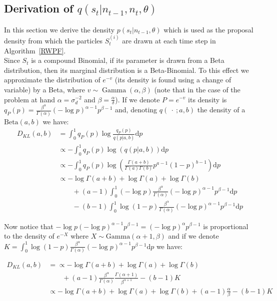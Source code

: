 \documentclass[12pt]{article}
\begin{document}
\begin{appendices}
	\subsection{Derivation of $q(s_t|n_{t-1}, n_t, \theta)$}
	In this section we derive the density $p(s_t|n_{t-1}, \theta)$ which is used as the proposal density from which the particles $S_t^{(i)}$ are drawn at each time step in Algorithm~\ref{RWPF}. \\
	Since $S_t$ is a compound Binomial, if its parameter is drawn from a Beta distribution, then its marginal distribution is a Beta-Binomial. To this effect we approximate the distribution of $e^{-v}$ (its density is found using a change of variable) by a Beta, where $v \sim \operatorname{Gamma}(\alpha, \beta)$ (note that in the case of the problem at hand $\alpha=\sigma_d^{-2}$ and $\beta=\frac{\alpha}{\delta}$). 
	If we denote $P=e^{-v}$ its density is $q_P(p)=\frac{\beta^\alpha}{\Gamma(\alpha)}(-\log p)^{\alpha-1}p^{\beta-1}$ and, denoting $q(\ \cdot \ ; a, b)$ the density of a $\mathrm{Beta}(a,b)$ we have:	
	\begin{align*}
	D_{KL}(a,b) & = \int_{0}^{1}q_P(p)\log\frac{q_P(p)}{q(p| a, b)}\mathrm{d}p \\
	& \propto - \int_{0}^{1}q_P(p)\log(q(p| a, b))\mathrm{d}p \\
	& \propto - \int_{0}^{1}q_P(p)\log(\frac{\Gamma(a+b)}{\Gamma(a)\Gamma(b)}p^{a-1}(1-p)^{b-1})\mathrm{d}p \\
	& \propto -\log\Gamma(a+b) + \log\Gamma(a) + \log\Gamma(b) \\ & \qquad  + (a-1)\int_{0}^{1}(-\log p)\frac{\beta^\alpha}{\Gamma(\alpha)}(-\log p)^{\alpha-1}p^{\beta-1}\mathrm{d}p \\ & \qquad - (b-1)\int_{0}^{1}\log (1-p)\frac{\beta^\alpha}{\Gamma(\alpha)}(-\log p)^{\alpha-1}p^{\beta-1}\mathrm{d}p
	\end{align*}
	
	Now notice that $-\log p(-\log p)^{\alpha-1}p^{\beta-1}= (-\log p)^{\alpha}p^{\beta-1}$ is proportional to the density of $e^{-X}$ where $X \sim \mathrm{Gamma}(\alpha+1, \beta)$ and if we denote $K=\int_{0}^{1}\log(1-p)\frac{\beta^\alpha}{\Gamma(\alpha)}(-\log p)^{\alpha-1}p^{\beta-1}\mathrm{d}p$ we have:
	
	\begin{equation*}
	\begin{split}
	D_{KL}(a,b) & = \propto -\log\Gamma(a+b) + \log\Gamma(a) + \log\Gamma(b) \\ 
	& \qquad  + (a-1)\frac{\beta^\alpha}{\Gamma(\alpha)}\frac{\Gamma(\alpha+1)}{\beta^{\alpha+1}} - (b-1)K \\
	& \propto -\log\Gamma(a+b) + \log\Gamma(a) + \log\Gamma(b) + (a-1)\frac{\alpha}{\beta} - (b-1)K
	\end{split}
	\end{equation*}
	

\end{appendices}
\end{document}
